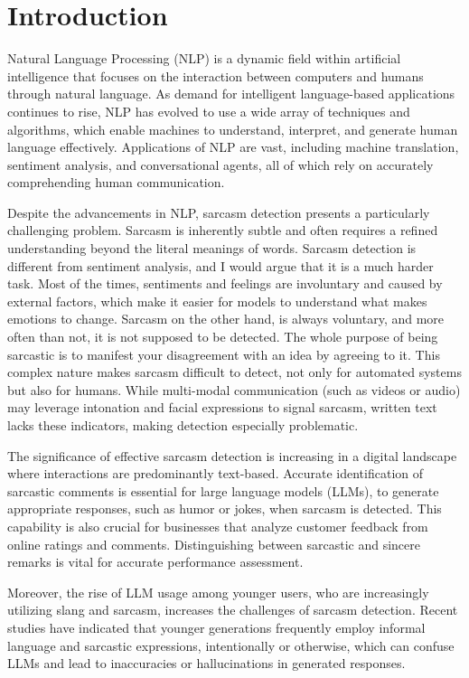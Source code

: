\section{Introduction}

Natural Language Processing (NLP) is a dynamic field within artificial intelligence that focuses on the interaction between computers and humans through natural language. 
As demand for intelligent language-based applications continues to rise, NLP has evolved to use a wide array of techniques and algorithms, which enable machines to understand, interpret, and 
generate human language effectively. Applications of NLP are vast, including machine translation, sentiment analysis, and conversational agents, all of which rely on accurately comprehending 
human communication.

Despite the advancements in NLP, sarcasm detection presents a particularly challenging problem. Sarcasm is inherently subtle and often requires a refined understanding beyond the literal 
meanings of words. Sarcasm detection is different from sentiment analysis, and I would argue that it is a much harder task. Most of the times, sentiments and feelings are involuntary and caused 
by external factors, which make it easier for models to understand what makes emotions to change. Sarcasm on the other hand, is always voluntary, and more often than not, it is not supposed to 
be detected. The whole purpose of being sarcastic is to manifest your disagreement with an idea by agreeing to it. This complex nature makes sarcasm difficult to detect, not only for automated 
systems but also for humans. While multi-modal communication (such as videos or audio) may leverage intonation and facial expressions to signal sarcasm, written text lacks these indicators, 
making detection especially problematic.

The significance of effective sarcasm detection is increasing in a digital landscape where interactions are predominantly text-based. Accurate identification of sarcastic comments is essential 
for large language models (LLMs), to generate appropriate responses, such as humor or jokes, when sarcasm is detected. This capability is also crucial for businesses that analyze customer 
feedback from online ratings and comments. Distinguishing between sarcastic and sincere remarks is vital for accurate performance assessment.

Moreover, the rise of LLM usage among younger users, who are increasingly utilizing slang and sarcasm, increases the challenges of sarcasm detection. 
Recent studies \cite{Juli_2024} have indicated that younger generations frequently employ informal language and sarcastic expressions, intentionally 
or otherwise, which can confuse LLMs and lead to inaccuracies or hallucinations in generated responses.

